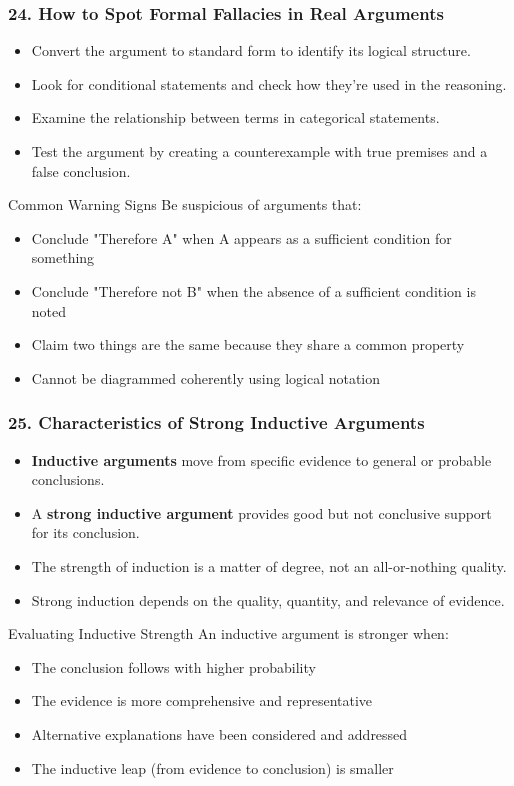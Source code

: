 \documentclass{beamer}
\begin{document}
\begin{frame}
\frametitle{24. How to Spot Formal Fallacies in Real Arguments}
\begin{itemize}
\item Convert the argument to standard form to identify its logical structure.
\item Look for conditional statements and check how they're used in the reasoning.
\item Examine the relationship between terms in categorical statements.
\item Test the argument by creating a counterexample with true premises and a false conclusion.
\end{itemize}

\begin{alertblock}{Common Warning Signs}
Be suspicious of arguments that:
\begin{itemize}
\item Conclude "Therefore A" when A appears as a sufficient condition for something
\item Conclude "Therefore not B" when the absence of a sufficient condition is noted
\item Claim two things are the same because they share a common property
\item Cannot be diagrammed coherently using logical notation
\end{itemize}
\end{alertblock}
\end{frame}

\begin{frame}
\frametitle{25. Characteristics of Strong Inductive Arguments}
\begin{itemize}
\item \textbf{Inductive arguments} move from specific evidence to general or probable conclusions.
\item A \textbf{strong inductive argument} provides good but not conclusive support for its conclusion.
\item The strength of induction is a matter of degree, not an all-or-nothing quality.
\item Strong induction depends on the quality, quantity, and relevance of evidence.
\end{itemize}

\begin{block}{Evaluating Inductive Strength}
An inductive argument is stronger when:
\begin{itemize}
\item The conclusion follows with higher probability
\item The evidence is more comprehensive and representative
\item Alternative explanations have been considered and addressed
\item The inductive leap (from evidence to conclusion) is smaller
\end{itemize}
\end{block}
\end{frame}
\end{document}
